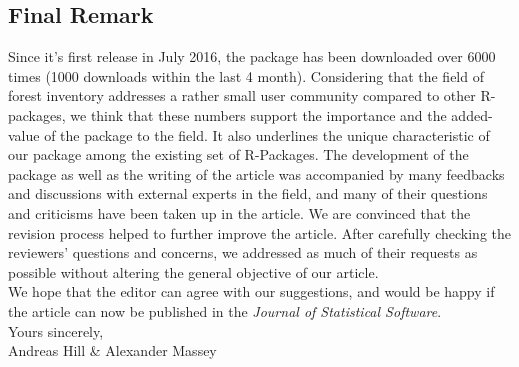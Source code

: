 \documentclass{article}
\begin{document}
\subsection*{Final Remark}

Since it's first release in July 2016, the package has been downloaded over 6000 times (1000 downloads within the last 4 month). Considering that the field of forest inventory addresses a rather small user community compared to other R-packages, we think that these numbers support the importance and the added-value of the package to the field. It also underlines the unique characteristic of our package among the existing set of R-Packages. The development of the package as well as the writing of the article was accompanied by many feedbacks and discussions with external experts in the field, and many of their questions and criticisms have been taken up in the article. We are convinced that the revision process helped to further improve the article. After carefully checking the reviewers' questions and concerns, we addressed as much of their requests as possible without altering the general objective of our article.\\

We hope that the editor can agree with our suggestions, and would be happy if the article can now be published in the \textit{Journal of Statistical Software}.\\

 
Yours sincerely,\\

Andreas Hill \& Alexander Massey







\begin{small}
\end{small}



\end{document}
